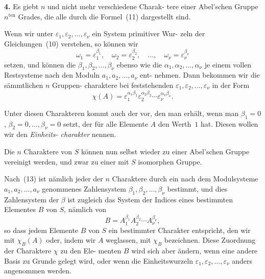 \documentclass[12pt,a4paper]{article}
\theoremstyle{plain}
\theoremstyle{definition}
\theoremstyle{remark}
\begin{document}
\textbf{4.} Es giebt $n$ und nicht mehr verschiedene Charak-
tere einer Abel'schen Gruppe $n^{\text{ten}}$ Grades, die
alle durch die Formel~(11) dargestellt sind.

Wenn wir unter $\varepsilon_1, \varepsilon_2, \ldots, \varepsilon_\nu$ ein System primitiver Wur-
zeln der Gleichungen~(10) verstehen, so können wir
\begin{equation}\tag{12}
\omega_1 = \varepsilon_1^{\beta_1}, \quad \omega_2 = \varepsilon_2^{\beta_2}, \quad \ldots, \quad \omega_\nu = \varepsilon_\nu^{\beta_\nu}
\end{equation}
setzen, und können die $\beta_1, \beta_2, \ldots, \beta_\nu$ ebenso wie die $\alpha_1, \alpha_2, \ldots, \alpha_\nu$
je einem vollen Restsysteme nach den Moduln $a_1, a_2, \ldots, a_\nu$ ent-
nehmen. Dann bekommen wir die sämmtlichen $n$ Gruppen-
charaktere bei feststehenden $\varepsilon_1, \varepsilon_2, \ldots, \varepsilon_\nu$ in der Form
\begin{equation}\tag{13}
\chi(A) = \varepsilon_1^{\alpha_1 \beta_1} \varepsilon_2^{\alpha_2 \beta_2} \cdots \varepsilon_\nu^{\alpha_\nu \beta_\nu}.
\end{equation}

Unter diesen Charakteren kommt auch der vor, den man
erhält, wenn man $\beta_1 = 0$, $\beta_2 = 0, \ldots, \beta_\nu = 0$ setzt, der für alle
Elemente $A$ den Werth~$1$ hat. Diesen wollen wir den \emph{Einheits-
charakter} nennen.

Die $n$ Charaktere von $S$ können nun selbst wieder zu einer
Abel'schen Gruppe vereinigt werden, und zwar zu einer mit $S$
isomorphen Gruppe.

Nach~(13) ist nämlich jeder der $n$ Charaktere durch ein
nach dem Modulsysteme $a_1, a_2, \ldots, a_\nu$ genommenes Zahlensystem
$\beta_1, \beta_2, \ldots, \beta_\nu$ bestimmt, und dies Zahlensystem der $\beta$ ist zugleich
das System der Indices eines bestimmten Elementes $B$ von $S$,
nämlich von
\begin{equation}\tag{14}
B = A_1^{\beta_1} A_2^{\beta_2} \cdots A_\nu^{\beta_\nu},
\end{equation}
so dass jedem Elemente $B$ von $S$ ein bestimmter Charakter
entspricht, den wir mit $\chi_B(A)$ oder, indem wir $A$ weglassen, mit
$\chi_B$ bezeichnen. Diese Zuordnung der Charaktere $\chi$ zu den Ele-
menten $B$ wird sich aber ändern, wenn eine andere Basis zu
Grunde gelegt wird, oder wenn die Einheitswurzeln $\varepsilon_1, \varepsilon_2, \ldots, \varepsilon_\nu$
anders angenommen werden.
\end{document}
